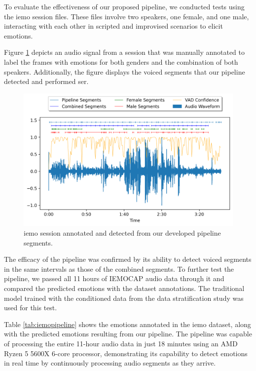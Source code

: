 To evaluate the effectiveness of our proposed pipeline, we conducted tests using the \ac{iemo} session files. These files involve two speakers, one female, and one male, interacting with each other in scripted and improvised scenarios to elicit emotions.

Figure \ref{fig:iemo_pipeline} depicts an audio signal from a session that was manually annotated to label the frames with emotions for both genders and the combination of both speakers. Additionally, the figure displays the voiced segments that our pipeline detected and performed \ac{ser}.

\begin{figure}[H]
	\centering
	\includegraphics[width=\textwidth]{figs/6_video_conf_ser/pipeline.png}
	\caption{\ac{iemo} session annotated and detected from our developed pipeline segments.}
	\label{fig:iemo_pipeline}
\end{figure}

The efficacy of the pipeline was confirmed by its ability to detect voiced segments in the same intervals as those of the combined segments. To further test the pipeline, we passed all 11 hours of IEMOCAP audio data through it and compared the predicted emotions with the dataset annotations. The traditional model trained with the conditioned data from the data stratification study was used for this test.

Table \ref{tab:iemopipeline} shows the emotions annotated in the \ac{iemo} dataset, along with the predicted emotions resulting from our pipeline. The pipeline was capable of processing the entire 11-hour audio data in just 18 minutes using an AMD Ryzen 5 5600X 6-core processor, demonstrating its capability to detect emotions in real time by continuously processing audio segments as they arrive.

